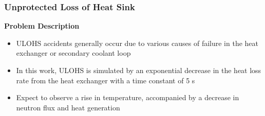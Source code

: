 \begin{frame}
	\frametitle{Unprotected Loss of Heat Sink}
		\textbf{Problem Description}
			\begin{itemize}
				\item \gls{ULOHS} accidents generally occur due to various causes
				of failure in the heat exchanger or secondary coolant loop
				\item In this work, \gls{ULOHS} is simulated by an exponential
				decrease in the heat loss rate from the heat exchanger with a
				time constant of 5 s
				\item Expect to observe a rise in temperature, accompanied by a
				decrease in neutron flux and heat generation
			\end{itemize}
\end{frame}

